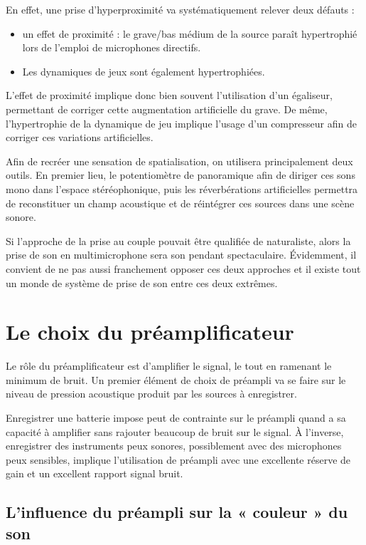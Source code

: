 \documentclass[
  letterpaper,
  DIV=11,
  numbers=noendperiod]{scrreprt}
\providecommand{\tightlist}{%
  \setlength{\itemsep}{0pt}\setlength{\parskip}{0pt}}\usepackage{longtable,booktabs,array}
\begin{document}
En effet, une prise d'hyperproximité va systématiquement relever deux
défauts :

\begin{itemize}
\tightlist
\item
  un effet de proximité : le grave/bas médium de la source paraît
  hypertrophié lors de l'emploi de microphones directifs.
\item
  Les dynamiques de jeux sont également hypertrophiées.
\end{itemize}

L'effet de proximité implique donc bien souvent l'utilisation d'un
égaliseur, permettant de corriger cette augmentation artificielle du
grave. De même, l'hypertrophie de la dynamique de jeu implique l'usage
d'un compresseur afin de corriger ces variations artificielles.

Afin de recréer une sensation de spatialisation, on utilisera
principalement deux outils. En premier lieu, le potentiomètre de
panoramique afin de diriger ces sons mono dans l'espace stéréophonique,
puis les réverbérations artificielles permettra de reconstituer un champ
acoustique et de réintégrer ces sources dans une scène sonore.

Si l'approche de la prise au couple pouvait être qualifiée de
naturaliste, alors la prise de son en multimicrophone sera son pendant
spectaculaire. Évidemment, il convient de ne pas aussi franchement
opposer ces deux approches et il existe tout un monde de système de
prise de son entre ces deux extrêmes.

\hypertarget{le-choix-du-pruxe9amplificateur}{%
\section{Le choix du
préamplificateur}\label{le-choix-du-pruxe9amplificateur}}

Le rôle du préamplificateur est d'amplifier le signal, le tout en
ramenant le minimum de bruit. Un premier élément de choix de préampli va
se faire sur le niveau de pression acoustique produit par les sources à
enregistrer.

Enregistrer une batterie impose peut de contrainte sur le préampli quand
a sa capacité à amplifier sans rajouter beaucoup de bruit sur le signal.
À l'inverse, enregistrer des instruments peux sonores, possiblement avec
des microphones peux sensibles, implique l'utilisation de préampli avec
une excellente réserve de gain et un excellent rapport signal bruit.

\hypertarget{linfluence-du-pruxe9ampli-sur-la-couleur-du-son}{%
\subsection{L'influence du préampli sur la « couleur » du
son}\label{linfluence-du-pruxe9ampli-sur-la-couleur-du-son}}
\end{document}
